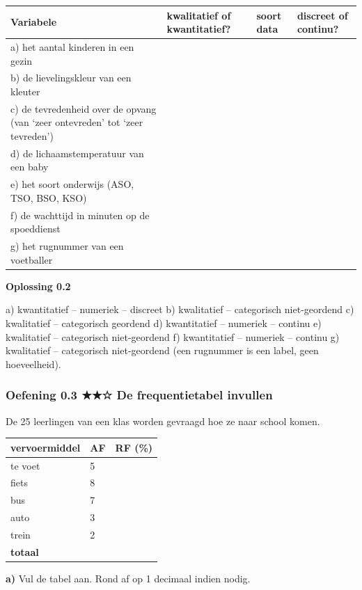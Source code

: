 \begin{tabular}{llll}
\hline
Variabele & kwalitatief of kwantitatief? & soort data & discreet of continu? \\
\hline
a) het aantal kinderen in een gezin & & & \\
b) de lievelingskleur van een kleuter & & & \\
c) de tevredenheid over de opvang (van ‘zeer ontevreden’ tot ‘zeer tevreden’) & & & \\
d) de lichaamstemperatuur van een baby & & & \\
e) het soort onderwijs (ASO, TSO, BSO, KSO) & & & \\
f) de wachttijd in minuten op de spoeddienst & & & \\
g) het rugnummer van een voetballer & & & \\
\hline
\end{tabular}

\begin{oplossing}
\textbf{Oplossing 0.2}

a) kwantitatief – numeriek – discreet \quad b) kwalitatief – categorisch niet-geordend \quad c) kwalitatief – categorisch geordend \quad d) kwantitatief – numeriek – continu \quad e) kwalitatief – categorisch niet-geordend \quad f) kwantitatief – numeriek – continu \quad g) kwalitatief – categorisch niet-geordend (een rugnummer is een label, geen hoeveelheid).
\end{oplossing}

\subsubsection*{Oefening 0.3 \quad ★★☆ \quad De frequentietabel invullen}

De 25 leerlingen van een klas worden gevraagd hoe ze naar school komen.

\begin{tabular}{lll}
\hline
vervoermiddel & AF & RF (\%) \\
\hline
te voet & 5 & \\
fiets & 8 & \\
bus & 7 & \\
auto & 3 & \\
trein & 2 & \\
\textbf{totaal} & & \\
\hline
\end{tabular}

\textbf{a)} Vul de tabel aan. Rond af op 1 decimaal indien nodig.

